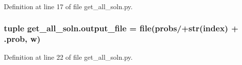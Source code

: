 Definition at line 17 of file get\+\_\+all\+\_\+soln.\+py.

\hypertarget{namespaceget__all__soln_a7fa2bae5f6d50024567ab2b36196692b}{}
\subsubsection[{output\+\_\+file}]{\setlength{\rightskip}{0pt plus 5cm}tuple get\+\_\+all\+\_\+soln.\+output\+\_\+file = file(\textquotesingle{}probs/\textquotesingle{}+str(index) + \textquotesingle{}.prob\textquotesingle{}, \textquotesingle{}w\textquotesingle{})}\label{namespaceget__all__soln_a7fa2bae5f6d50024567ab2b36196692b}


Definition at line 22 of file get\+\_\+all\+\_\+soln.\+py.

